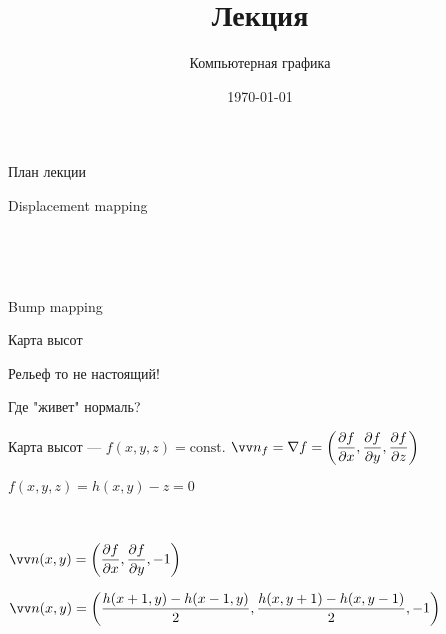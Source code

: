 \documentclass[10pt]{beamer}
\date{\today}
\title{Лекция \lecdni \\ \LectionTheme}
\subtitle{Компьютерная графика}
\begin{document}
 		 


\newcommand \abs[1] {\left| #1 \right|}

\everymath{\displaystyle}

    
    \QRFRAME	
	

	\frame{\maketitle}

	
	\begin{frame}{План лекции}
	\end{frame}
	

\begin{frame}{Displacement mapping}
	
	{
	}{
		
		~
		
		~
		
	}
	
	
	
\end{frame}
	
\begin{frame}{Bump mapping}
	
	{
	}{
		\centering{}
	}
\end{frame}	

\begin{frame}{Карта высот}
	
	\centering{}
	
\end{frame}

\begin{frame}{Рельеф то не настоящий!}
	
	\centering{}
	
\end{frame}


\begin{frame}{Где "живет" нормаль?}
	
	{
	}{
		Карта высот --- $f(x,y,z)=\mathrm{const}$.
		$\vv n_f = \nabla f = \left( \dfrac{\partial f}{\partial x},\dfrac{\partial f}{\partial y},\dfrac{\partial f}{\partial z} \right)$
		
		$f(x,y,z) = h(x,y) -z=0$
		
		~
		
		$\vv n(x,y) = \left( \dfrac{\partial f}{\partial x},\dfrac{\partial f}{\partial y},-1 \right)$
	}
	$\vv n(x,y) = \left(\dfrac{h(x+1,y)-h(x-1,y) }{2},\dfrac{h(x,y+1)-h(x,y-1) }{2}, -1  \right) $
\end{frame}
	
\end{document}
